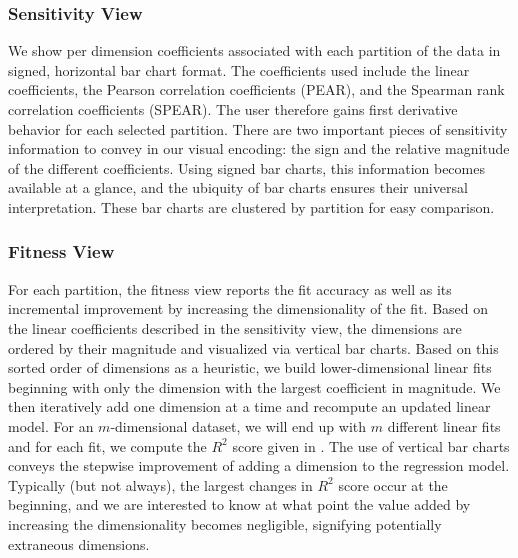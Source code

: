 \subsubsection{Sensitivity View}
\label{sec:sensitivityView}
We show per dimension coefficients associated with each
partition of the data in signed, horizontal bar chart format.
%
%
The coefficients used include the linear coefficients, the Pearson correlation coefficients (PEAR), and the Spearman rank correlation coefficients (SPEAR).
%
The user therefore gains first derivative behavior for each selected partition.
%
There are two important pieces of sensitivity information to convey in our visual encoding: the sign and the relative magnitude of the different coefficients.
%
Using signed bar charts, this information becomes available at a glance, and the ubiquity of bar charts ensures their universal interpretation.
%
These bar charts are clustered by partition for easy comparison.

\subsubsection{Fitness View}
\label{sec:fitnessView}
For each partition, the fitness view reports the fit accuracy as well as its incremental improvement by increasing the dimensionality of the fit.
%
Based on the linear coefficients described in the sensitivity view, the dimensions are ordered by their magnitude and visualized via vertical bar charts.
%
Based on this sorted order of dimensions as a heuristic, we build lower-dimensional linear fits beginning with only the dimension with the largest coefficient in magnitude.
%
We then iteratively add one dimension at a time and recompute an updated linear model.
%
For an $m$-dimensional dataset, we will end up with $m$ different linear fits and for each fit, we compute the $R^2$ score given in .
%
The use of vertical bar charts conveys the stepwise improvement of adding a dimension to the regression model.
%
Typically (but not always), the largest changes in $R^2$ score occur at the beginning, and we are interested to know at what point the value added by increasing the dimensionality becomes negligible, signifying potentially extraneous dimensions.

